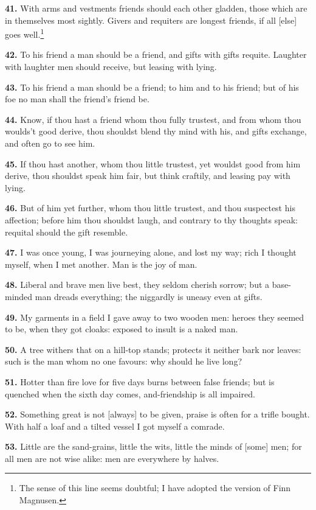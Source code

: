 \textbf{41.} With arms and vestments friends should each other gladden, those
which are in themselves most sightly. Givers and requiters are longest
friends, if all [else] goes well.\footnote{The sense of this line seems doubtful; I have adopted
the version of Finn Magnusen.}

\textbf{42.} To his friend a man should be a friend, and gifts with gifts
requite. Laughter with laughter men should receive, but leasing with
lying.

\textbf{43.} To his friend a man should be a friend; to him and to his
friend; but of his foe no man shall the friend's friend be.

\textbf{44.} Know, if thou hast a friend whom thou fully trustest, and from
whom thou woulds't good derive, thou shouldst blend thy mind with his,
and gifts exchange, and often go to see him.

\textbf{45.} If thou hast another, whom thou little trustest, yet wouldst
good from him derive, thou shouldst speak him fair, but think
craftily, and leasing pay with lying.

\textbf{46.} But of him yet further, whom thou little trustest, and thou
suspectest his affection; before him thou shouldst laugh, and contrary
to thy thoughts speak: requital should the gift resemble.

\textbf{47.} I was once young, I was journeying alone, and lost my way; rich
I thought myself, when I met another. Man is the joy of man.

\textbf{48.} Liberal and brave men live best, they seldom cherish sorrow; but
a base-minded man dreads everything; the niggardly is uneasy even at
gifts.

\textbf{49.} My garments in a field I gave away to two wooden men: heroes
they seemed to be, when they got cloaks: exposed to insult is a naked
man.

\textbf{50.} A tree withers that on a hill-top stands; protects it neither
bark nor leaves: such is the man whom no one favours: why should he
live long?

\textbf{51.} Hotter than fire love for five days burns between false
friends; but is quenched when the sixth day comes, and-friendship is
all impaired.

\textbf{52.} Something great is not [always] to be given, praise is often for
a trifle bought. With half a loaf and a tilted vessel I got myself a
comrade.

\textbf{53.} Little are the sand-grains, little the wits, little the minds of
[some] men; for all men are not wise alike: men are everywhere by
halves.

